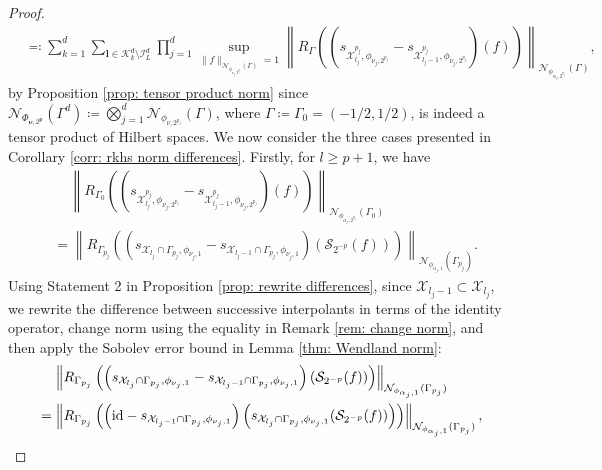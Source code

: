\documentclass[pdflatex,sn-mathphys-num]{sn-jnl}%
\theoremstyle{thmstyleone}%
\theoremstyle{thmstyletwo}%
\theoremstyle{thmstylethree}%
\begin{document}
\begin{proof}
\begin{align}
         &\eqqcolon\sum_{k=1}^d\sum_{\boldsymbol{l}\in\mathcal{K}^d_k\setminus \mathcal{I}^d_L}\prod_{j=1}^d\sup_{\|f\|_{\mathcal{N}_{\phi_{\nu_j,2^{p_j}}}(\Gamma)}=1}\left\|R_{\Gamma}\left(\left(s_{\mathcal{X}^{p_j}_{l_j},\phi_{\nu_j,2^{p_j}}}-s_{\mathcal{X}^{p_j}_{l_j-1},\phi_{\nu_j,2^{p_j}}}\right)(f)\right)\right\|_{\mathcal{N}_{\phi_{{\alpha_j},2^{{p_j}}}}(\Gamma)},\label{eq: 1st case pause 1}
    \end{align}
    by Proposition \ref{prop: tensor product norm} since \(\mathcal{N}_{\Phi_{\boldsymbol{\nu},2^{\mathbf{p}}}}(\Gamma^d)\coloneqq\bigotimes_{j=1}^d\mathcal{N}_{\phi_{{\nu},2^{{p_j}}}}(\Gamma)\), where \(\Gamma\coloneqq\Gamma_0=(-1/2,1/2)\), is indeed a tensor product of Hilbert spaces. We now consider the three cases presented in Corollary \ref{corr: rkhs norm differences}. Firstly, for \(l\geq p+1\), we have
    \begin{align}
        &\quad\,\left\|R_{\Gamma_0}\left(\left(s_{\mathcal{X}^{p_j}_{l_j},\phi_{\nu_j,2^{p_j}}}-s_{\mathcal{X}^{p_j}_{l_j-1},\phi_{\nu_j,2^{p_j}}}\right)(f)\right)\right\|_{\mathcal{N}_{\phi_{{\alpha_j},2^{{p_j}}}}(\Gamma_0)}\nonumber\\
        &=\left\|R_{\Gamma_{p_j}}\left(\left(s_{\mathcal{X}_{l_j}\cap\Gamma_{p_j},\phi_{\nu_j,1}}-s_{\mathcal{X}_{l_j-1}\cap\Gamma_{p_j},\phi_{\nu_j,1}}\right)\left(\mathcal{S}_{2^{-p}}(f)\right)\right)\right\|_{\mathcal{N}_{\phi_{{\alpha_j},1}}(\Gamma_{p_j})}.\label{eq: 1st case pause 2}   
    \end{align}
     Using Statement 2 in Proposition \ref{prop: rewrite differences}, since \(\mathcal{X}_{l_j-1}\subset\mathcal{X}_{l_j}\), we rewrite the difference between successive interpolants in terms of the identity operator, change norm using the equality in Remark \ref{rem: change norm}, and then apply the Sobolev error bound in Lemma \ref{thm: Wendland norm}:
    \begin{align}
       \begin{split} &\quad\,\left\|R_{\Gamma_{p_j}}\left(\left(s_{\mathcal{X}_{l_j}\cap\Gamma_{p_j},\phi_{\nu_j,1}}-s_{\mathcal{X}_{l_j-1}\cap\Gamma_{p_j},\phi_{\nu_j,1}}\right)(\mathcal{S}_{2^{-p}}(f))\right)\right\|_{\mathcal{N}_{\phi_{{\alpha_j},1}}(\Gamma_{p_j})}\nonumber\\
        &=\left\|R_{\Gamma_{p_j}}\left(\left(\textup{id}-s_{\mathcal{X}_{l_j-1}\cap\Gamma_{p_j},\phi_{\nu_j,1}}\right)\left(s_{\mathcal{X}_{l_j}\cap\Gamma_{p_j},\phi_{\nu_j,1}}(\mathcal{S}_{2^{-p}}(f))\right)\right)\right\|_{\mathcal{N}_{\phi_{{\alpha_j},1}}(\Gamma_{p_j})},

\end{split}
\end{align}
\end{proof}
\end{document}
